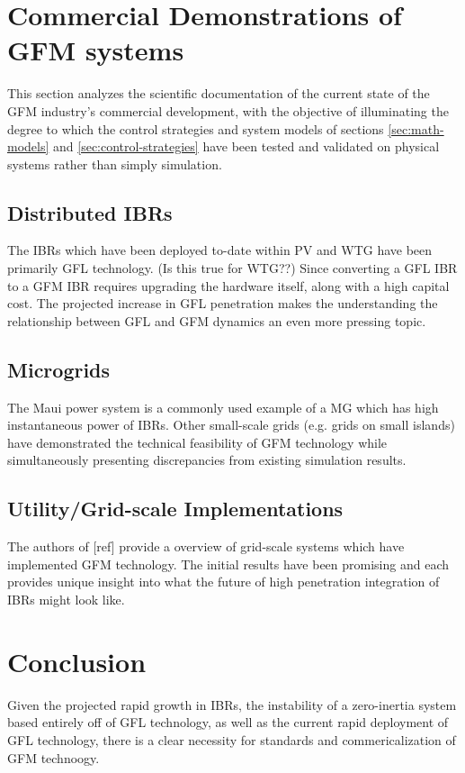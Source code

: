 \documentclass[journal]{IEEEtran}
\begin{document}
\section{Commercial Demonstrations of GFM systems}
\label{sec:commericial-demonstrations}

This section analyzes the scientific documentation of the
current state of the GFM industry's commercial development,
with the objective of illuminating the degree to which
the control strategies and system models of sections
\ref{sec:math-models} and \ref{sec:control-strategies}
have been tested and validated on physical systems rather
than simply simulation.

\subsection{Distributed IBRs}
The IBRs which have been deployed to-date within PV and WTG
have been primarily GFL technology. (Is this true for WTG??)
Since converting a GFL IBR to a GFM IBR requires upgrading
the hardware itself, along with a high capital cost. The projected
increase in GFL penetration makes the understanding the relationship
between GFL and GFM dynamics an even more pressing topic.

\subsection{Microgrids}
The Maui power system is a commonly used example of a MG which has 
high instantaneous power of IBRs. Other small-scale  grids
(e.g. grids on small islands) have demonstrated the technical
feasibility of GFM technology while simultaneously presenting 
discrepancies from existing simulation results.

\subsection{Utility/Grid-scale Implementations}
The authors of [ref]\cite{abook}%
provide a overview of grid-scale systems which have implemented GFM
technology. The initial results have been promising and each provides
unique insight into what the future of high penetration integration of
IBRs might look like.



\section{Conclusion}
Given the projected rapid growth in IBRs, the instability of a
zero-inertia system based entirely off of GFL technology, as well
as the current rapid deployment of GFL technology, there is a clear
necessity for standards and commericalization of GFM technoogy.
\end{document}
